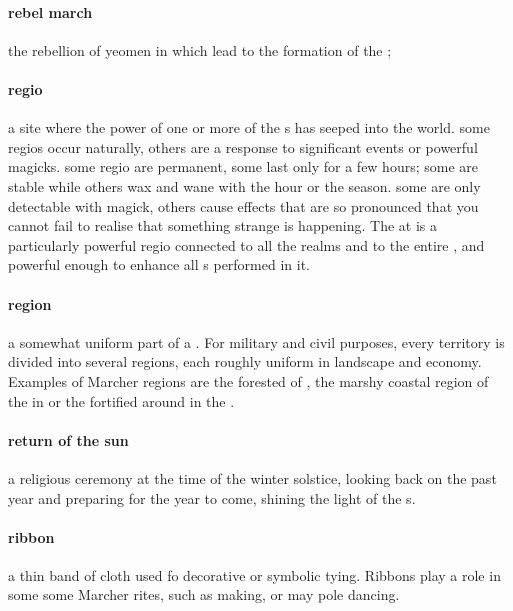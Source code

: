 \paragraph{rebel march} the rebellion of yeomen in  which lead to the formation of the ; 
\paragraph{regio} a site where the power of one or more of the s has seeped into the world. some regios occur naturally, others are a response to significant events or powerful magicks. some regio are permanent, some last only for a few hours; some are stable while others wax and wane with the hour or the season. some are only detectable with magick, others cause effects that are so pronounced that you cannot fail to realise that something strange is happening. The  at  is a particularly powerful regio connected to all the realms and to the entire , and powerful enough to enhance all s performed in it.
\paragraph{region} a somewhat uniform part of a . For military and civil purposes, every territory is divided into several regions, each roughly uniform in landscape and economy. Examples of Marcher regions are the forested  of , the marshy coastal region of the  in  or the fortified  around  in the .
\paragraph{return of the sun} a religious ceremony at the time of the winter solstice, looking back on the past year and preparing for the year to come, shining the light of the s.
\paragraph{ribbon} a thin band of cloth used fo decorative or symbolic tying. Ribbons play a role in some some Marcher rites, such as  making,  or may pole dancing.
